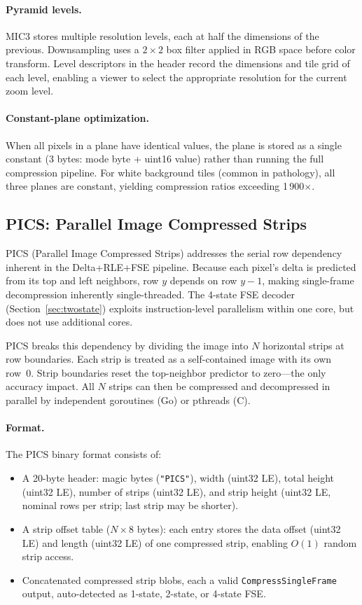 \documentclass[11pt,twocolumn]{article}
\begin{document}
\paragraph{Pyramid levels.}
MIC3 stores multiple resolution levels, each at half the dimensions of the previous.
Downsampling uses a $2\times2$ box filter applied in RGB space before color transform.
Level descriptors in the header record the dimensions and tile grid of each level, enabling a viewer to select the appropriate resolution for the current zoom level.

\paragraph{Constant-plane optimization.}
When all pixels in a plane have identical values, the plane is stored as a single constant (3 bytes: mode byte + uint16 value) rather than running the full compression pipeline.
For white background tiles (common in pathology), all three planes are constant, yielding compression ratios exceeding 1\,900$\times$.

\subsection{PICS: Parallel Image Compressed Strips}
\label{sec:pics}

PICS (Parallel Image Compressed Strips) addresses the serial row dependency inherent in the Delta+RLE+FSE pipeline.
Because each pixel's delta is predicted from its top and left neighbors, row $y$ depends on row $y-1$, making single-frame decompression inherently single-threaded.
The 4-state FSE decoder (Section~\ref{sec:twostate}) exploits instruction-level parallelism within one core, but does not use additional cores.

PICS breaks this dependency by dividing the image into $N$ horizontal strips at row boundaries.
Each strip is treated as a self-contained image with its own row~0.
Strip boundaries reset the top-neighbor predictor to zero---the only accuracy impact.
All $N$ strips can then be compressed and decompressed in parallel by independent goroutines (Go) or pthreads (C).

\paragraph{Format.}
The PICS binary format consists of:
\begin{itemize}[nosep]
    \item A 20-byte header: magic bytes (\texttt{"PICS"}), width (uint32 LE), total height (uint32 LE), number of strips (uint32 LE), and strip height (uint32 LE, nominal rows per strip; last strip may be shorter).
    \item A strip offset table ($N \times 8$ bytes): each entry stores the data offset (uint32 LE) and length (uint32 LE) of one compressed strip, enabling $O(1)$ random strip access.
    \item Concatenated compressed strip blobs, each a valid \texttt{CompressSingleFrame} output, auto-detected as 1-state, 2-state, or 4-state FSE.
\end{itemize}
\end{document}
